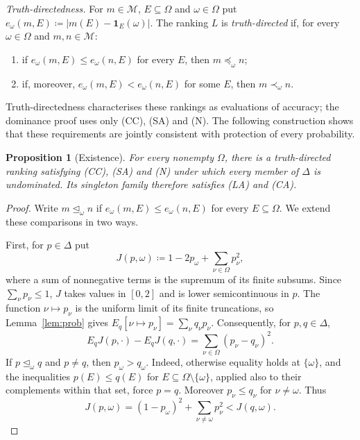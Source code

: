 \documentclass[11pt]{article}
\newenvironment{chgblockb}{\color{red}}{}
\newtheorem{proposition}[theorem]{Proposition}
\theoremstyle{definition}
\theoremstyle{remark}
\newcommand{\M}{\mathcal M}
\begin{document}
\begin{chgblockb}
\emph{Truth-directedness.} For $m\in\M$, $E\subseteq\Omega$ and $\omega\in\Omega$ put $e_\omega(m,E)\coloneqq|m(E)-\mathbf 1_E(\omega)|$. The ranking $L$ is \emph{truth-directed} if, for every $\omega\in\Omega$ and $m,n\in\M$:
\begin{enumerate}[label=(TD\arabic*),leftmargin=3em]
\item\label{TD1} if $e_\omega(m,E)\le e_\omega(n,E)$ for every $E$, then $m\preceq_\omega n$;
\item\label{TD2} if, moreover, $e_\omega(m,E)<e_\omega(n,E)$ for some $E$, then $m\prec_\omega n$.
\end{enumerate}
Truth-directedness characterises these rankings as evaluations of accuracy; the dominance proof uses only (CC), (SA) and (N). The following construction shows that these requirements are jointly consistent with protection of every probability.

\begin{proposition}[Existence]\label{prop:accuracy-existence}
For every nonempty $\Omega$, there is a truth-directed ranking satisfying (CC), (SA) and (N) under which every member of $\Delta$ is undominated. Its singleton family therefore satisfies (LA) and (CA).
\end{proposition}
\begin{proof}
Write $m\unlhd_\omega n$ if $e_\omega(m,E)\le e_\omega(n,E)$ for every $E\subseteq\Omega$. We extend these comparisons in two ways.

First, for $p\in\Delta$ put
\[
J(p,\omega)\coloneqq 1-2p_\omega+\sum_{\nu\in\Omega}p_\nu^2,
\]
where a sum of nonnegative terms is the supremum of its finite subsums. Since $\sum_\nu p_\nu\le1$, $J$ takes values in $[0,2]$ and is lower semicontinuous in $p$. The function $\nu\mapsto p_\nu$ is the uniform limit of its finite truncations, so Lemma~\ref{lem:prob} gives $E_q[\nu\mapsto p_\nu]=\sum_\nu q_\nu p_\nu$. Consequently, for $p,q\in\Delta$,
\begin{equation}\label{eq:atomic-brier}
E_qJ(p,\cdot)-E_qJ(q,\cdot)
=\sum_{\nu\in\Omega}(p_\nu-q_\nu)^2.
\end{equation}
If $p\unlhd_\omega q$ and $p\ne q$, then $p_\omega>q_\omega$. Indeed, otherwise equality holds at $\{\omega\}$, and the inequalities $p(E)\le q(E)$ for $E\subseteq\Omega\setminus\{\omega\}$, applied also to their complements within that set, force $p=q$. Moreover $p_\nu\le q_\nu$ for $\nu\ne\omega$. Thus
\[
J(p,\omega)=(1-p_\omega)^2+\sum_{\nu\ne\omega}p_\nu^2
<J(q,\omega).
\]


\end{proof}
\end{chgblockb}
\end{document}
